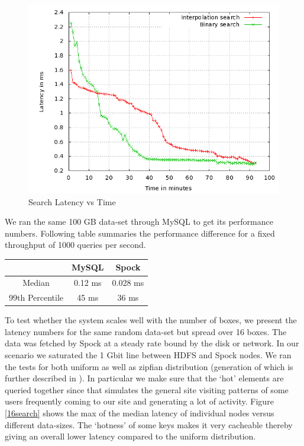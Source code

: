 \documentclass[twocolumn]{article}
\newcommand{\projectname}{Spock}
\begin{document}
\begin{figure}
  \centering
    \includegraphics[scale=0.35]{images/search_1node.png}
  \caption{Search Latency vs Time}
  \label{search}
\end{figure}

We ran the same 100 GB data-set through MySQL to get its performance numbers. Following table summaries the performance difference for a fixed throughput of 1000 queries per second. 

\begin{center}
    \begin{tabular}{ | c | c | c |  }
    \hline
     & MySQL & \projectname{} \\ \hline
    Median &   0.12 ms &  0.028	ms \\
	99th Percentile	& 45 ms & 36 ms \\
\hline
    \end{tabular}
\end{center}

To test whether the system scales well with the number of boxes, we present the latency numbers for the same random data-set but spread over 16 boxes. The data was fetched by \projectname{} at a steady rate bound by the disk or network. In our scenario we saturated the 1 Gbit line between HDFS and \projectname{} nodes. We ran the tests for both uniform as well as zipfian distribution (generation of which is further described in \cite{gray}). In particular we make sure that the `hot' elements are queried together since that simulates the general site visiting patterns of some users frequently coming to our site and generating a lot of activity. Figure \ref{16search} shows the max of the median latency of individual nodes versus different data-sizes. The `hotness' of some keys makes it very cacheable thereby giving an overall lower latency compared to the uniform distribution. 
\end{document}
